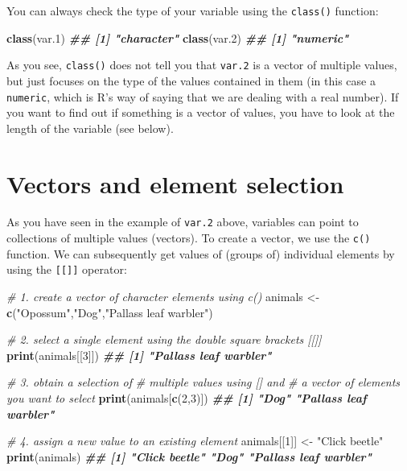 \documentclass[
]{book}
\newenvironment{Shaded}{\begin{snugshade}}{\end{snugshade}}
\newcommand{\CommentTok}[1]{\textcolor[rgb]{0.56,0.35,0.01}{\textit{#1}}}
\newcommand{\DecValTok}[1]{\textcolor[rgb]{0.00,0.00,0.81}{#1}}
\newcommand{\DocumentationTok}[1]{\textcolor[rgb]{0.56,0.35,0.01}{\textbf{\textit{#1}}}}
\newcommand{\FunctionTok}[1]{\textcolor[rgb]{0.13,0.29,0.53}{\textbf{#1}}}
\newcommand{\NormalTok}[1]{#1}
\newcommand{\OtherTok}[1]{\textcolor[rgb]{0.56,0.35,0.01}{#1}}
\newcommand{\StringTok}[1]{\textcolor[rgb]{0.31,0.60,0.02}{#1}}
\begin{document}
You can always check the type of your variable using the \texttt{class()} function:

\begin{Shaded}
\begin{Highlighting}[]
\FunctionTok{class}\NormalTok{(var.1)}
\DocumentationTok{\#\# [1] "character"}
\FunctionTok{class}\NormalTok{(var.2)}
\DocumentationTok{\#\# [1] "numeric"}
\end{Highlighting}
\end{Shaded}

As you see, \texttt{class()} does not tell you that \texttt{var.2} is a vector of multiple values, but just focuses on the type of the values contained in them (in this case a \texttt{numeric}, which is R's way of saying that we are dealing with a real number). If you want to find out if something is a vector of values, you have to look at the length of the variable (see below).

\section{Vectors and element selection}\label{vectors-and-element-selection}

As you have seen in the example of \texttt{var.2} above, variables can point to collections of multiple values (vectors). To create a vector, we use the \texttt{c()} function. We can subsequently get values of (groups of) individual elements by using the \texttt{{[}{[}{]}{]}} operator:

\begin{Shaded}
\begin{Highlighting}[]
\CommentTok{\# 1. create a vector of character elements using c()}
\NormalTok{animals }\OtherTok{\textless{}{-}} \FunctionTok{c}\NormalTok{(}\StringTok{"Opossum"}\NormalTok{,}\StringTok{"Dog"}\NormalTok{,}\StringTok{"Pallas\textquotesingle{}s leaf warbler"}\NormalTok{)}

\CommentTok{\# 2. select a single element using the double square brackets [[]]}
\FunctionTok{print}\NormalTok{(animals[[}\DecValTok{3}\NormalTok{]])}
\DocumentationTok{\#\# [1] "Pallas\textquotesingle{}s leaf warbler"}


\CommentTok{\# 3. obtain a selection of }
\CommentTok{\# multiple values using [] and}
\CommentTok{\# a vector of elements you want to select}
\FunctionTok{print}\NormalTok{(animals[}\FunctionTok{c}\NormalTok{(}\DecValTok{2}\NormalTok{,}\DecValTok{3}\NormalTok{)])}
\DocumentationTok{\#\# [1] "Dog"                   "Pallas\textquotesingle{}s leaf warbler"}


\CommentTok{\# 4. assign a new value to an existing element}
\NormalTok{animals[[}\DecValTok{1}\NormalTok{]] }\OtherTok{\textless{}{-}} \StringTok{"Click beetle"}
\FunctionTok{print}\NormalTok{(animals)}
\DocumentationTok{\#\# [1] "Click beetle"          "Dog"                   "Pallas\textquotesingle{}s leaf warbler"}
\end{Highlighting}
\end{Shaded}
\end{document}
